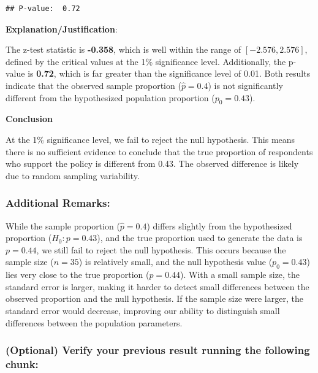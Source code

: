 \documentclass[
  11pt,
]{article}
\begin{document}
\begin{verbatim}
## P-value:  0.72
\end{verbatim}

\textbf{Explanation/Justification}:

The z-test statistic is \textbf{-0.358}, which is well within the range
of \([-2.576, 2.576]\), defined by the critical values at the 1\%
significance level. Additionally, the p-value is \textbf{0.72}, which is
far greater than the significance level of 0.01. Both results indicate
that the observed sample proportion (\(\hat{p} = 0.4\)) is not
significantly different from the hypothesized population proportion
(\(p_0 = 0.43\)).

\textbf{Conclusion}

At the 1\% significance level, we fail to reject the null hypothesis.
This means there is no sufficient evidence to conclude that the true
proportion of respondents who support the policy is different from 0.43.
The observed difference is likely due to random sampling variability.

\subsubsection{Additional Remarks:}\label{additional-remarks}

While the sample proportion (\(\hat{p} = 0.4\)) differs slightly from
the hypothesized proportion (\(H_0: p = 0.43\)), and the true proportion
used to generate the data is \(p = 0.44\), we still fail to reject the
null hypothesis. This occurs because the sample size (\(n = 35\)) is
relatively small, and the null hypothesis value (\(p_0 = 0.43\)) lies
very close to the true proportion (\(p = 0.44\)). With a small sample
size, the standard error is larger, making it harder to detect small
differences between the observed proportion and the null hypothesis. If
the sample size were larger, the standard error would decrease,
improving our ability to distinguish small differences between the
population parameters.

\subsubsection{(Optional) Verify your previous result running the
following
chunk:}\label{optional-verify-your-previous-result-running-the-following-chunk}
\end{document}
